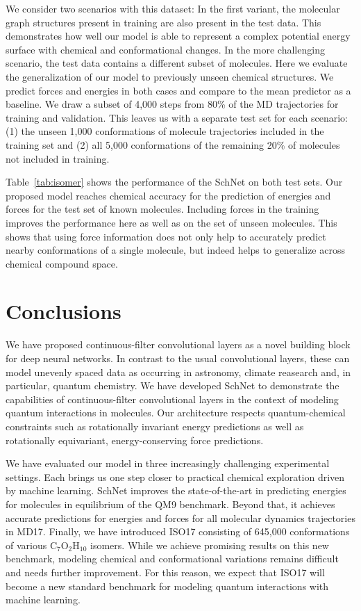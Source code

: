 \documentclass{article}
\begin{document}
We consider two scenarios with this dataset:
In the first variant, the molecular graph structures present in training are also present in the test data.
This demonstrates how well our model is able to represent a complex potential energy surface with chemical and conformational changes.
In the more challenging scenario, the test data contains a different subset of molecules. 
Here we evaluate the generalization of our model to previously unseen chemical structures.
We predict forces and energies in both cases and compare to the mean predictor as a baseline.
We draw a subset of 4,000 steps from 80\% of the MD trajectories for training and validation.
This leaves us with a separate test set for each scenario: 
(1) the unseen 1,000 conformations of molecule trajectories included in the training set and
(2) all 5,000 conformations of the remaining 20\% of molecules not included in training.

Table~\ref{tab:isomer} shows the performance of the SchNet on both test sets.
Our proposed model reaches chemical accuracy for the prediction of energies and forces for the test set of known molecules.
Including forces in the training improves the performance here as well as on the set of unseen molecules.
This shows that using force information does not only help to accurately predict nearby conformations of a single molecule, but indeed helps to generalize across chemical compound space.

\section{Conclusions}
We have proposed continuous-filter convolutional layers as a novel building block for deep neural networks.
In contrast to the usual convolutional layers, these can model unevenly spaced data as occurring in astronomy, climate reasearch and, in particular, quantum chemistry.
We have developed SchNet to demonstrate the capabilities of continuous-filter convolutional layers in the context of modeling quantum interactions in molecules.
Our architecture respects quantum-chemical constraints such as rotationally invariant energy predictions as well as rotationally equivariant, energy-conserving force predictions.

We have evaluated our model in three increasingly challenging experimental settings.
Each brings us one step closer to practical chemical exploration driven by machine learning.
SchNet improves the state-of-the-art in predicting energies for molecules in equilibrium of the QM9 benchmark.
Beyond that, it achieves accurate predictions for energies and forces for all molecular dynamics trajectories in MD17.
Finally, we have introduced ISO17 consisting of 645,000 conformations of various C$_7$O$_2$H$_{10}$ isomers.
While we achieve promising results on this new benchmark, modeling chemical and conformational variations remains difficult and needs further improvement.
For this reason, we expect that ISO17 will become a new standard benchmark for modeling quantum interactions with machine learning.
\end{document}
